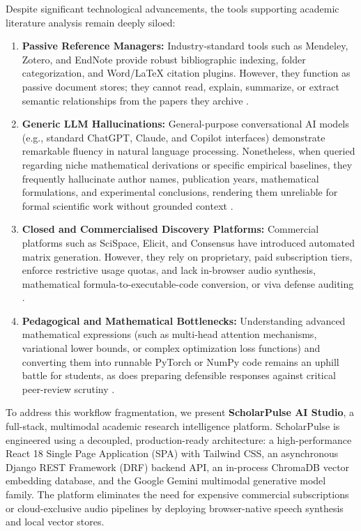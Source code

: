 \documentclass[conference]{IEEEtran}
\begin{document}
Despite significant technological advancements, the tools supporting academic literature analysis remain deeply siloed:
\begin{enumerate}
    \item \textbf{Passive Reference Managers:} Industry-standard tools such as Mendeley, Zotero, and EndNote provide robust bibliographic indexing, folder categorization, and Word/LaTeX citation plugins. However, they function as passive document stores; they cannot read, explain, summarize, or extract semantic relationships from the papers they archive \cite{alharbi2024}.
    \item \textbf{Generic LLM Hallucinations:} General-purpose conversational AI models (e.g., standard ChatGPT, Claude, and Copilot interfaces) demonstrate remarkable fluency in natural language processing. Nonetheless, when queried regarding niche mathematical derivations or specific empirical baselines, they frequently hallucinate author names, publication years, mathematical formulations, and experimental conclusions, rendering them unreliable for formal scientific work without grounded context \cite{ji2023, ogunleye2025}.
    \item \textbf{Closed and Commercialised Discovery Platforms:} Commercial platforms such as SciSpace, Elicit, and Consensus have introduced automated matrix generation. However, they rely on proprietary, paid subscription tiers, enforce restrictive usage quotas, and lack in-browser audio synthesis, mathematical formula-to-executable-code conversion, or viva defense auditing \cite{sharma2024}.
    \item \textbf{Pedagogical and Mathematical Bottlenecks:} Understanding advanced mathematical expressions (such as multi-head attention mechanisms, variational lower bounds, or complex optimization loss functions) and converting them into runnable PyTorch or NumPy code remains an uphill battle for students, as does preparing defensible responses against critical peer-review scrutiny \cite{murillo2024, lewis2020}.
\end{enumerate}

To address this workflow fragmentation, we present \textbf{ScholarPulse AI Studio}, a full-stack, multimodal academic research intelligence platform. ScholarPulse is engineered using a decoupled, production-ready architecture: a high-performance React 18 Single Page Application (SPA) with Tailwind CSS, an asynchronous Django REST Framework (DRF) backend API, an in-process ChromaDB vector embedding database, and the Google Gemini multimodal generative model family. The platform eliminates the need for expensive commercial subscriptions or cloud-exclusive audio pipelines by deploying browser-native speech synthesis and local vector stores.
\end{document}
